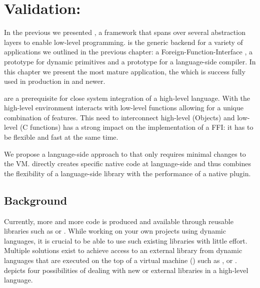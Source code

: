 
\chapter{Validation: \FFI}
\minitoc
\introduction

In the previous  we presented \B, a framework that spans over several abstraction layers to enable low-level programming.
\B is the generic backend for a variety of applications we outlined in the previous chapter: a Foreign-Function-Interface \FFI, a prototype for dynamic primitives and a prototype for a language-side \JIT compiler.
In this chapter we present the most mature \B application, the \FFI which is success	fully used in production in  and newer.

\FFIs are a prerequisite for close system integration of a high-level language.
With \FFIs the high-level environment interacts with low-level functions allowing for a unique combination of features.
This need to interconnect high-level (Objects) and low-level (C functions) has a strong impact on the implementation of a FFI: it has to be flexible and fast at the same time.

We propose \NB a language-side approach to \FFIs that only requires minimal changes to the VM.
\NB directly creates specific native code at language-side and thus combines the flexibility of a language-side library with the performance of a native plugin.

\newpage
\section{Background}

Currently, more and more code is produced and available through reusable libraries such as  or .
While working on your own projects using dynamic languages, it is crucial to be able to use such existing libraries with little effort.
Multiple solutions exist to achieve access to an external library from dynamic languages that are executed on the top of a virtual machine (\VM) such as ,  or .
 depicts four possibilities of dealing with new or external libraries in a high-level language.


